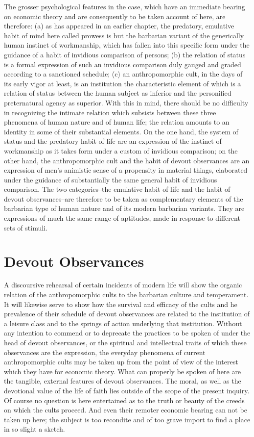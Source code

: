 \documentclass[12pt]{report}
\begin{document}
The grosser psychological features in the case, which have an immediate
bearing on economic theory and are consequently to be taken account
of here, are therefore: (a) as has appeared in an earlier chapter,
the predatory, emulative habit of mind here called prowess is but the
barbarian variant of the generically human instinct of workmanship,
which has fallen into this specific form under the guidance of a habit
of invidious comparison of persons; (b) the relation of status is a
formal expression of such an invidious comparison duly gauged and graded
according to a sanctioned schedule; (c) an anthropomorphic cult, in the
days of its early vigor at least, is an institution the characteristic
element of which is a relation of status between the human subject as
inferior and the personified preternatural agency as superior. With
this in mind, there should be no difficulty in recognizing the intimate
relation which subsists between these three phenomena of human nature
and of human life; the relation amounts to an identity in some of their
substantial elements. On the one hand, the system of status and the
predatory habit of life are an expression of the instinct of workmanship
as it takes form under a custom of invidious comparison; on the other
hand, the anthropomorphic cult and the habit of devout observances
are an expression of men's animistic sense of a propensity in material
things, elaborated under the guidance of substantially the same general
habit of invidious comparison. The two categories--the emulative habit
of life and the habit of devout observances--are therefore to be taken
as complementary elements of the barbarian type of human nature and of
its modern barbarian variants. They are expressions of much the same
range of aptitudes, made in response to different sets of stimuli.




\chapter{Devout Observances}
A discoursive rehearsal of certain incidents of modern life will show
the organic relation of the anthropomorphic cults to the barbarian
culture and temperament. It will likewise serve to show how the survival
and efficacy of the cults and he prevalence of their schedule of devout
observances are related to the institution of a leisure class and to the
springs of action underlying that institution. Without any intention to
commend or to deprecate the practices to be spoken of under the head of
devout observances, or the spiritual and intellectual traits of which
these observances are the expression, the everyday phenomena of current
anthropomorphic cults may be taken up from the point of view of the
interest which they have for economic theory. What can properly
be spoken of here are the tangible, external features of devout
observances. The moral, as well as the devotional value of the life of
faith lies outside of the scope of the present inquiry. Of course no
question is here entertained as to the truth or beauty of the creeds on
which the cults proceed. And even their remoter economic bearing can not
be taken up here; the subject is too recondite and of too grave import
to find a place in so slight a sketch.
\end{document}
